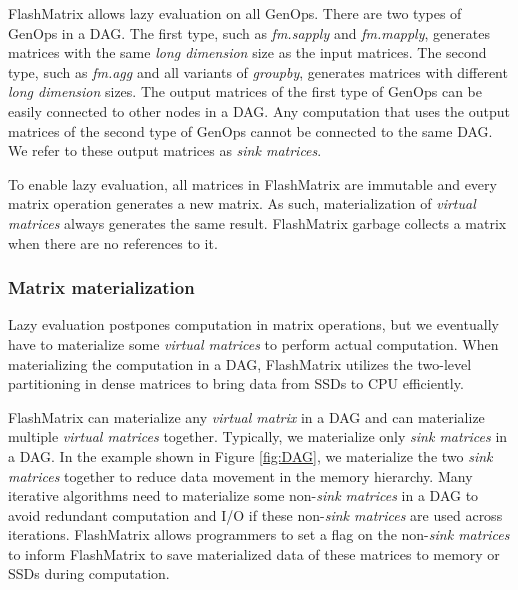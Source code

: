FlashMatrix allows lazy evaluation on all GenOps. There are two types of GenOps
in a DAG. The first type, such as \textit{fm.sapply} and \textit{fm.mapply}, generates
matrices with the same \textit{long dimension} size as the input matrices.
The second type, such as \textit{fm.agg} and all variants of \textit{groupby},
generates matrices
with different \textit{long dimension} sizes. The output matrices of the first
type of GenOps can be easily connected to other nodes in a DAG. Any computation
that uses the output matrices of the second type of GenOps
cannot be connected to the same DAG.  We refer to these output matrices as
\textit{sink matrices}.

To enable lazy evaluation, all matrices in FlashMatrix are immutable and every
matrix operation generates a new matrix. As such, materialization of
\textit{virtual matrices} always generates the same result. FlashMatrix
garbage collects a matrix when there are no references to it.

\subsubsection{Matrix materialization} \label{sec:materialize}
Lazy evaluation postpones computation in matrix operations, but we eventually
have to materialize some \textit{virtual matrices} to perform actual computation.
When materializing the computation in a DAG, FlashMatrix utilizes the two-level
partitioning in dense matrices to bring data from SSDs to CPU efficiently.

FlashMatrix can materialize any \textit{virtual matrix} in a DAG and
can materialize multiple \textit{virtual matrices} together. Typically, we
materialize only \textit{sink matrices} in a DAG. In the example shown in
Figure \ref{fig:DAG}, we materialize the two \textit{sink matrices} together
to reduce data movement in the memory hierarchy. Many iterative algorithms need
to materialize some non-\textit{sink matrices} in a DAG to avoid redundant
computation and I/O if these non-\textit{sink matrices} are used across
iterations. FlashMatrix allows programmers to set a flag on the
non-\textit{sink matrices} to inform FlashMatrix to save materialized data
of these matrices to memory or SSDs during computation.

